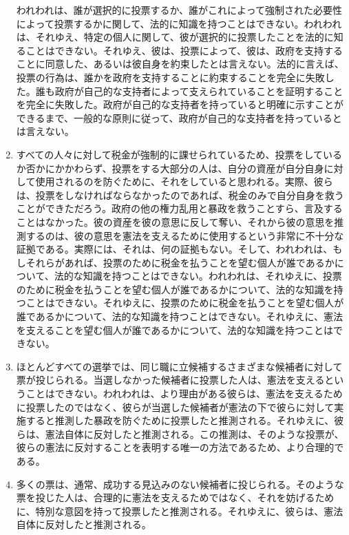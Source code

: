 \documentclass[dvipdfmx, uplatex, tate, landscape]{utbook}
\begin{document}
\begin{enumerate}
    われわれは、誰が選択的に投票するか、誰がこれによって強制された必要性によって投票するかに関して、法的に知識を持つことはできない。われわれは、それゆえ、特定の個人に関して、彼が選択的に投票したことを法的に知ることはできない。それゆえ、彼は、投票によって、彼は、政府を支持することに同意した、あるいは彼自身を約束したとは言えない。法的に言えば、投票の行為は、誰かを政府を支持することに約束することを完全に失敗した。誰も政府が自己的な支持者によって支えられていることを証明することを完全に失敗した。政府が自己的な支持者を持っていると明確に示すことができるまで、一般的な原則に従って、政府が自己的な支持者を持っているとは言えない。

  \item すべての人々に対して税金が強制的に課せられているため、投票をしているか否かにかかわらず、投票をする大部分の人は、自分の資産が自分自身に対して使用されるのを防ぐために、それをしていると思われる。実際、彼らは、投票をしなければならなかったのであれば、税金のみで自分自身を救うことができただろう。政府の他の権力乱用と暴政を救うことすら、言及することはなかった。彼の資産を彼の意思に反して奪い、それから彼の意思を推測するのは、彼の意思を憲法を支えるために使用するという非常に不十分な証拠である。実際には、それは、何の証拠もない。そして、われわれは、もしそれらがあれば、投票のために税金を払うことを望む個人が誰であるかについて、法的な知識を持つことはできない。われわれは、それゆえに、投票のために税金を払うことを望む個人が誰であるかについて、法的な知識を持つことはできない。それゆえに、投票のために税金を払うことを望む個人が誰であるかについて、法的な知識を持つことはできない。それゆえに、憲法を支えることを望む個人が誰であるかについて、法的な知識を持つことはできない。

  \item ほとんどすべての選挙では、同じ職に立候補するさまざまな候補者に対して票が投じられる。当選しなかった候補者に投票した人は、憲法を支えるということはできない。われわれは、より理由がある彼らは、憲法を支えるために投票したのではなく、彼らが当選した候補者が憲法の下で彼らに対して実施すると推測した暴政を防ぐために投票したと推測される。それゆえに、彼らは、憲法自体に反対したと推測される。この推測は、そのような投票が、彼らの憲法に反対することを表明する唯一の方法であるため、より合理的である。

  \item 多くの票は、通常、成功する見込みのない候補者に投じられる。そのような票を投じた人は、合理的に憲法を支えるためではなく、それを妨げるために、特別な意図を持って投票したと推測される。それゆえに、彼らは、憲法自体に反対したと推測される。


\end{enumerate}
\end{document}
